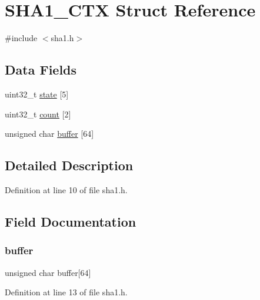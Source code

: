 \hypertarget{struct_s_h_a1___c_t_x}{}\section{S\+H\+A1\+\_\+\+C\+TX Struct Reference}
\label{struct_s_h_a1___c_t_x}


{\ttfamily \#include $<$sha1.\+h$>$}

\subsection*{Data Fields}
\begin{DoxyCompactItemize}
\item 
uint32\+\_\+t \hyperlink{struct_s_h_a1___c_t_x_a81e965b2e6a5e3da77038538085d264a}{state} \mbox{[}5\mbox{]}
\item 
uint32\+\_\+t \hyperlink{struct_s_h_a1___c_t_x_a73e44f39b2a2ee389d7f8641a4c777a6}{count} \mbox{[}2\mbox{]}
\item 
unsigned char \hyperlink{struct_s_h_a1___c_t_x_a59e96eea04541ecd67c3faca41b13feb}{buffer} \mbox{[}64\mbox{]}
\end{DoxyCompactItemize}


\subsection{Detailed Description}


Definition at line 10 of file sha1.\+h.



\subsection{Field Documentation}
\mbox{\label{struct_s_h_a1___c_t_x_a59e96eea04541ecd67c3faca41b13feb}} 
\subsubsection{\texorpdfstring{buffer}{buffer}}
{\footnotesize\ttfamily unsigned char buffer\mbox{[}64\mbox{]}}



Definition at line 13 of file sha1.\+h.

\mbox{\label{struct_s_h_a1___c_t_x_a73e44f39b2a2ee389d7f8641a4c777a6}} 
